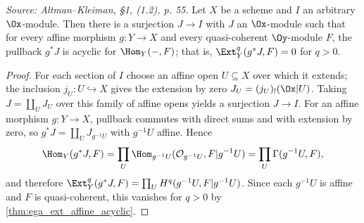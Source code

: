 \begin{lemma}
  \label{lem:acyclic_surjection}
  \textit{Source: Altman--Kleiman, §1, (1.2), p. 55.}
  Let $X$ be a scheme and $I$ an arbitrary $\Ox$-module. Then there is a
  surjection $J \to I$ with $J$ an $\Ox$-module such that for every affine
  morphism $g : Y \to X$ and every quasi-coherent $\Oy$-module $F$, the pullback
  $g^* J$ is acyclic for $\Hom_Y(-,F)$; that is, $\Ext^q_Y(g^* J, F) = 0$ for
  $q > 0$.
  \begin{proof}
    For each section of $I$ choose an affine open $U \subseteq X$ over which it
    extends; the inclusion $j_U : U \hookrightarrow X$ gives the extension by zero
    $J_U = (j_U)_!(\Ox|U)$. Taking $J = \coprod_U J_U$ over this family of affine
    opens yields a surjection $J \to I$. For an affine morphism $g : Y \to X$,
    pullback commutes with direct sums and with extension by zero, so
    $g^* J = \coprod_U J_{g^{-1}U}$ with $g^{-1}U$ affine. Hence
    \[
      \Hom_Y(g^* J, F) = \prod_U \Hom_{g^{-1}U}(\mathcal{O}_{g^{-1}U},
        F|g^{-1}U) = \prod_U \Gamma(g^{-1}U, F),
    \]
    and therefore $\Ext^q_Y(g^* J, F) = \prod_U H^q(g^{-1}U, F|g^{-1}U)$. Since
    each $g^{-1}U$ is affine and $F$ is quasi-coherent, this vanishes for $q>0$ by
    \cref{thm:ega_ext_affine_acyclic}.
  \end{proof}
\end{lemma}

